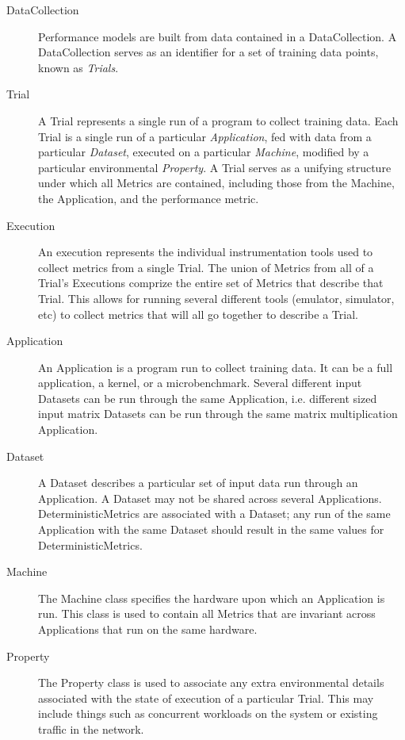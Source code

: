 \begin{description}
\item[DataCollection]Performance models are built from data contained in a
DataCollection. A DataCollection serves as an identifier for a set of training
data points, known as {\em Trials}.

\item[Trial] A Trial represents a single run of a program to collect training data.
Each Trial is a single run of a particular {\em Application}, fed with data from a
particular {\em Dataset}, executed on a particular {\em Machine}, modified by a particular
environmental {\em Property}.  A Trial serves as a unifying structure under which all
Metrics are contained, including those from the Machine, the Application, and
the performance metric.

\item[Execution] An execution represents the individual instrumentation tools used
to collect metrics from a single Trial. The union of Metrics from all of a
Trial's Executions comprize the entire set of Metrics that describe that Trial.
This allows for running several different tools (emulator, simulator, etc) to
collect metrics that will all go together to describe a Trial.

\item[Application] An Application is a program run to collect training data. It can
be a full application, a kernel, or a microbenchmark.  Several different input
Datasets can be run through the same Application, i.e. different sized input
matrix Datasets can be run through the same matrix multiplication Application.

\item[Dataset] A Dataset describes a particular set of input data run through an
Application. A Dataset may not be shared across several Applications.
DeterministicMetrics are associated with a Dataset; any run of the same
Application with the same Dataset should result in the same values for
DeterministicMetrics.

\item[Machine] The Machine class specifies the hardware upon which an Application is
run. This class is used to contain all Metrics that are invariant across
Applications that run on the same hardware.

\item[Property] The Property class is used to associate any extra environmental
details associated with the state of execution of a particular Trial. This may
include things such as concurrent workloads on the system or existing traffic
in the network.


\end{description}
